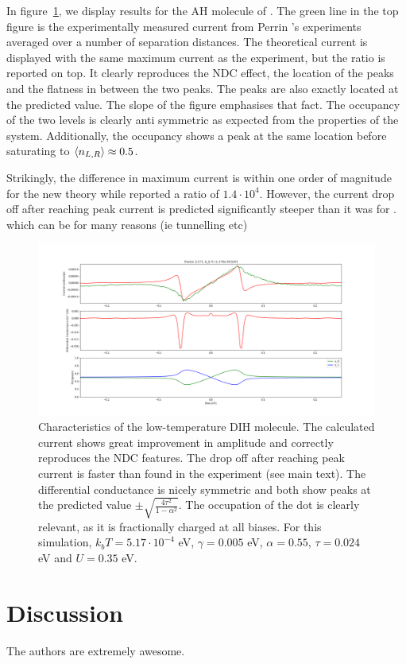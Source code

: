 \documentclass{article}
\begin{document}
\begin{multicols}{2}
        In figure~\ref{fig:perrinmolecule}, we display results for the AH molecule of \citet{perrinnano}. The green line in the top figure is the experimentally measured current from Perrin 's experiments averaged over a number of separation distances. The theoretical current is displayed with the same maximum current as the experiment, but the ratio is reported on top. It clearly reproduces the NDC effect, the location of the peaks and the flatness in between the two peaks. The peaks are also exactly located at the predicted value. The slope of the figure emphasises that fact. The occupancy of the two levels is clearly anti symmetric as expected from the properties of the system. Additionally, the occupancy shows a peak at the same location before saturating to $\braket{n_{L,R}}\approx0.5$.
    
        Strikingly, the difference in maximum current is within one order of magnitude for the new theory while \citet{perrinnano} reported a ratio of $1.4\cdot10^{4}$. However, the current drop off after reaching peak current is predicted significantly steeper than it was for \citet{perrinnano}.  {\color{red} which can be for many reasons (ie tunnelling etc)}
        
        
        
    \begin{figure}[b]
        \centering
        \includegraphics[width=\textwidth]{figure_gam0050alpha55tau024capacitive35points200.png}
        \caption{\label{fig:perrinmolecule} Characteristics of the low-temperature DIH molecule. The calculated current shows great improvement in amplitude and correctly reproduces the NDC features. The drop off after reaching peak current  is faster than found in the experiment (see main text). The differential conductance is nicely symmetric and both show peaks at the predicted value $\pm\sqrt{\frac{4\tau^2}{1-\alpha^2}}$. The occupation of the dot is clearly relevant, as it is fractionally charged at all biases. For this simulation, $k_b T=5.17\cdot 10^{-4}$ eV, $\gamma=0.005$ eV, $\alpha=0.55$, $\tau=0.024$ eV and $U=0.35$ eV.}
    \end{figure}
    
    \section{Discussion}\label{sec:discussion}
    The authors are extremely awesome.
     
\end{multicols}
\end{document}
